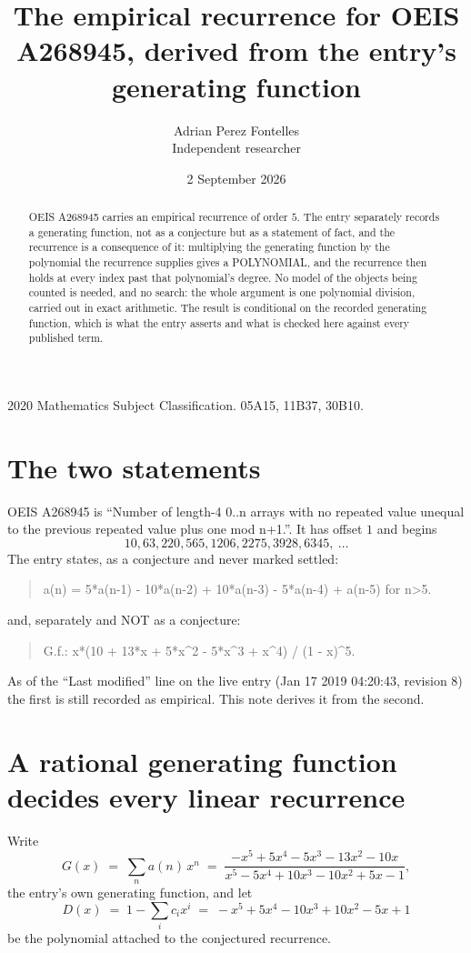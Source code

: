 \documentclass[11pt,a4paper]{article}
\title{The empirical recurrence for OEIS A268945, derived from the entry's generating function}
\author{Adrian Perez Fontelles\\ \small Independent researcher}
\date{2 September 2026}
\theoremstyle{plain}
\theoremstyle{definition}
\begin{document}
\maketitle

\begin{abstract}
OEIS A268945 carries an empirical recurrence of order $5$. The entry separately records a
generating function, not as a conjecture but as a statement of fact, and the recurrence is a
consequence of it: multiplying the generating function by the polynomial the recurrence
supplies gives a POLYNOMIAL, and the recurrence then holds at every index past that
polynomial's degree. No model of the objects being counted is needed, and no search: the
whole argument is one polynomial division, carried out in exact arithmetic. The result is
conditional on the recorded generating function, which is what the entry asserts and what is
checked here against every published term.
\end{abstract}

\noindent\small 2020 Mathematics Subject Classification. 05A15, 11B37, 30B10.\normalsize

\section{The two statements}

OEIS A268945 is ``Number of length-4 0..n arrays with no repeated value unequal to the previous repeated value plus one mod n+1.''. It has offset $1$ and begins
\[
10, 63, 220, 565, 1206, 2275, 3928, 6345,\ \dots
\]
The entry states, as a conjecture and never marked settled:
\begin{quote}
a(n) = 5*a(n-1) - 10*a(n-2) + 10*a(n-3) - 5*a(n-4) + a(n-5) for n>5.
\end{quote}
and, separately and NOT as a conjecture:
\begin{quote}
G.f.: x*(10 + 13*x + 5*x\^{}2 - 5*x\^{}3 + x\^{}4) / (1 - x)\^{}5.
\end{quote}
As of the ``Last modified'' line on the live entry (Jan 17 2019 04:20:43, revision 8) the first is still
recorded as empirical. This note derives it from the second.

\section{A rational generating function decides every linear recurrence}

Write
\[
G(x)\;=\;\sum_{n}a(n)\,x^{n}\;=\;\frac{- x^{5} + 5 x^{4} - 5 x^{3} - 13 x^{2} - 10 x}{x^{5} - 5 x^{4} + 10 x^{3} - 10 x^{2} + 5 x - 1},
\]
the entry's own generating function, and let
\[
D(x)\;=\;1-\sum_i c_i x^{i}\;=\;- x^{5} + 5 x^{4} - 10 x^{3} + 10 x^{2} - 5 x + 1
\]
be the polynomial attached to the conjectured recurrence.
\end{document}
